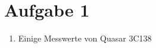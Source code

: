 \documentclass[11pt,a4paper]{scrartcl}
\begin{document}
\section*{Aufgabe 1}

\begin{enumerate}[label=\textbf{(\alph*)}]

\item
Einige Messwerte von Quasar 3C138

\end{enumerate}
\end{document}

